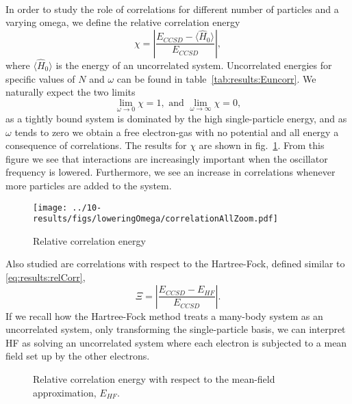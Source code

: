 \paragraph{}
In order to study the role of correlations for different number of particles and a varying omega, we define the relative correlation energy
\begin{equation}
\label{eq:results:relCorr}
\chi = \left|  \frac{E_{CCSD} - \langle \hat{H}_0 \rangle}{E_{CCSD}}  \right| ,
\end{equation}
where $\langle \hat{H}_0 \rangle $ is the energy of an uncorrelated system. 
Uncorrelated energies for specific values of $N$ and $\omega$ can be found in table~\ref{tab:results:Euncorr}.
We naturally expect the two limits
\begin{equation}
\lim_{\omega \rightarrow 0} \chi = 1,
\textrm{ and }
\lim_{\omega \rightarrow \infty} \chi = 0,
\end{equation}
as a tightly bound system is dominated by the high single-particle energy, and as $\omega$ tends to zero we obtain a free electron-gas with no potential and all energy a consequence of correlations.
The results for $\chi$ are shown in fig.~\ref{fig:results:relCorr}.
From this figure we see that interactions are increasingly important when the oscillator frequency is lowered.
Furthermore, we see an increase in correlations whenever more particles are added to the system.
\begin{figure}
\begin{center}
\texttt{[image: ../10-results/figs/loweringOmega/correlationAllZoom.pdf]}
\caption{Relative correlation energy}
\label{fig:results:relCorr}
\end{center}
\end{figure}


Also studied are correlations with respect to the Hartree-Fock, defined similar to \eqref{eq:results:relCorr},
\begin{equation}
\label{eq:results:relCorrHF}
\Xi = \left| \frac{E_{CCSD} - E_{HF} }{E_{CCSD}} \right| .
\end{equation}
If we recall how the Hartree-Fock method treats a many-body system as an uncorrelated system, only transforming the single-particle basis, we can interpret HF as solving an uncorrelated system where each electron is subjected to a mean field set up by the other electrons.
\begin{figure}
\begin{center}
\caption{Relative correlation energy with respect to the mean-field approximation, $E_{HF}$.}
\label{fig:results:relCorrHF}
\end{center}
\end{figure}


